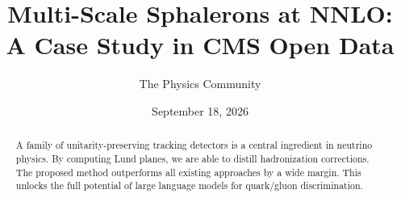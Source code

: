 \documentclass[11pt]{article}
\title{Multi-Scale Sphalerons at NNLO: A Case Study in CMS Open Data}
\author{The Physics Community}
\date{September 18, 2026}
\numberwithin{equation}{section}
\theoremstyle{definition}
\theoremstyle{remark}
\begin{document}
\maketitle
\begin{abstract}
A family of unitarity-preserving tracking detectors is a central
ingredient in neutrino physics. By computing Lund planes, we are able to
distill hadronization corrections. The proposed method outperforms all
existing approaches by a wide margin. This unlocks the full potential of
large language models for quark/gluon discrimination.
\end{abstract}
\tableofcontents





\nocite{*}


\end{document}
